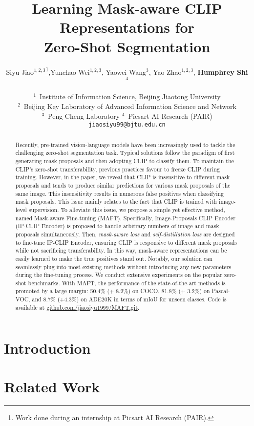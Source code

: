 \documentclass{article}
\title{Learning Mask-aware CLIP Representations for \\ Zero-Shot Segmentation}
\author{%
  Siyu Jiao$^{1, 2, 3}$\thanks{Work done during an internship at Picsart AI Research (PAIR).},\quad Yunchao Wei$^{1, 2, 3}$, \quad Yaowei Wang$^{3}$, \quad Yao Zhao$^{1, 2, 3}$, \quad \textbf{Humphrey Shi} $^{4}$\\
  \\
  $^1$~Institute of Information Science, Beijing Jiaotong University \\
  $^{2}$~Beijing Key Laboratory of Advanced Information Science and Network \\
  $^3$~Peng Cheng Laboratory \quad  $^4$~Picsart AI Research (PAIR) \\
  \texttt{jiaosiyu99@bjtu.edu.cn} \\
}
\begin{document}
\maketitle


\begin{abstract}

Recently, pre-trained vision-language models have been increasingly used to tackle the challenging zero-shot segmentation task. Typical solutions follow the paradigm of first generating mask proposals and then adopting CLIP to classify them. To maintain the CLIP's zero-shot transferability, previous practices favour to freeze CLIP during training. However, in the paper, we reveal that CLIP is insensitive to different mask proposals and tends to produce similar predictions for various mask proposals of the same image. This insensitivity results in numerous false positives when classifying mask proposals. This issue mainly relates to the fact that CLIP is trained with image-level supervision.
To alleviate this issue, we propose a simple yet effective method, named Mask-aware Fine-tuning (MAFT). Specifically,  Image-Proposals CLIP Encoder (IP-CLIP Encoder) is proposed to handle arbitrary numbers of image and mask proposals simultaneously. Then, \textit{mask-aware loss} and \textit{self-distillation loss} are designed to fine-tune IP-CLIP Encoder, ensuring CLIP is responsive to different mask proposals while not sacrificing transferability.
In this way, mask-aware representations can be easily learned to make the true positives stand out. Notably, our solution can seamlessly plug into most existing methods without introducing any new parameters during the fine-tuning process. 
We conduct extensive experiments on the popular zero-shot benchmarks. With MAFT, the performance of the state-of-the-art methods is promoted by a large margin: 50.4\% (+ 8.2\%) on COCO, 81.8\% (+ 3.2\%) on Pascal-VOC, and 8.7\% (+4.3\%) on ADE20K in terms of mIoU for unseen classes. 
Code is available at 
\href{https://github.com/jiaosiyu1999/MAFT.git}{github.com/jiaosiyu1999/MAFT.git}.

\end{abstract}



\section{Introduction}
\label{sec:intro}


\section{Related Work}
\label{sec:related}

\end{document}
